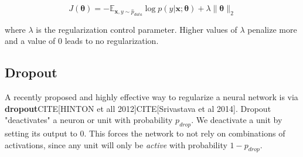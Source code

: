 \[J(\bm{\theta}) = -\mathbb{E}_{\bm{x},y \sim \hat p_{data}} \log \textit{p}(y|\bm{x};\bm{\theta}) + \lambda \lVert \bm{\theta} \rVert_{2}\]

where $\lambda$ is the regularization control parameter. Higher values of $\lambda$ penalize more and a value of 0 leads to no regularization.

\subsection{Dropout}
A recently proposed and highly effective way to regularize a neural network is via \textbf{dropout}CITE[HINTON et all 2012]CITE[Srivastava et al 2014].
Dropout "deactivates" a neuron or unit with probability $p_{drop}$. We deactivate a unit
by setting its output to 0. This forces the network to not rely on combinations of
activations, since any unit will only be \textit{active} with probability $1-p_{drop}$.
